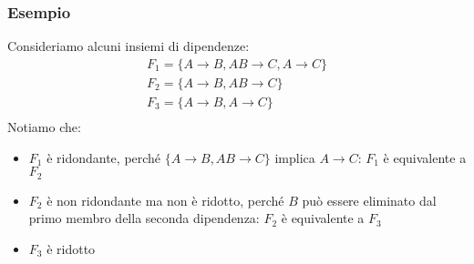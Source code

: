 \subsubsection{Esempio}
Consideriamo alcuni insiemi di dipendenze:
    \begin{equation}\begin{aligned}
        F_1 = \{  A \rightarrow B, AB \rightarrow C, A \rightarrow C  \}\\
        F_2 = \{  A \rightarrow B, AB \rightarrow C \}\\
        F_3 = \{  A \rightarrow B, A \rightarrow C  \}\\
    \end{aligned}\end{equation}
Notiamo che:
    \begin{itemize}
        \item{$F_1$ è ridondante, perché $\{A \rightarrow B, AB \rightarrow C\}$ implica $A \rightarrow C$: $F_1$ è equivalente a $F_2$}
        \item{$F_2$ è non ridondante ma non è ridotto, perché $B$ può essere eliminato dal primo membro della seconda dipendenza: $F_2$ è equivalente a $F_3$}
        \item{$F_3$ è ridotto}
    \end{itemize}

